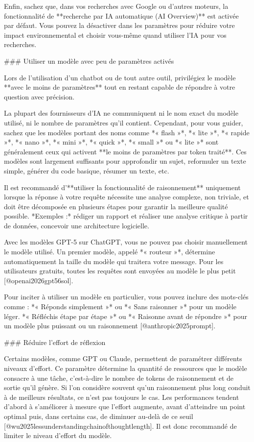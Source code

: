 Enfin, sachez que, dans vos recherches avec Google ou d'autres moteurs, la fonctionnalité de **recherche par IA automatique (AI Overview)** est activée par défaut. Vous pouvez la désactiver dans les paramètres pour réduire votre impact environnemental et choisir vous-même quand utiliser l'IA pour vos recherches.

### Utiliser un modèle avec peu de paramètres activés

Lors de l'utilisation d'un chatbot ou de tout autre outil, privilégiez le modèle **avec le moins de paramètres** tout en restant capable de répondre à votre question avec précision.

La plupart des fournisseurs d'IA ne communiquent ni le nom exact du modèle utilisé, ni le nombre de paramètres qu'il contient. Cependant, pour vous guider, sachez que les modèles portant des noms comme *« flash »*, *« lite »*, *« rapide »*, *« nano »*, *« mini »*, *« quick »*, *« small »* ou *« lite »* sont généralement ceux qui activent **le moins de paramètres par token traité**. Ces modèles sont largement suffisants pour approfondir un sujet, reformuler un texte simple, générer du code basique, résumer un texte, etc.

Il est recommandé d'**utiliser la fonctionnalité de raisonnement** uniquement lorsque la réponse à votre requête nécessite une analyse complexe, non triviale, et doit être décomposée en plusieurs étapes pour garantir la meilleure qualité possible.
*Exemples :* rédiger un rapport et réaliser une analyse critique à partir de données, concevoir une architecture logicielle.

Avec les modèles GPT-5 sur ChatGPT, vous ne pouvez pas choisir manuellement le modèle utilisé. Un premier modèle, appelé *« routeur »*, détermine automatiquement la taille du modèle qui traitera votre message.
Pour les utilisateurs gratuits, toutes les requêtes sont envoyées au modèle le plus petit [@openai2026gpt56sol].

Pour inciter à utiliser un modèle en particulier, vous pouvez inclure des mots-clés comme :
*« Réponds simplement »* ou *« Sans raisonner »* pour un modèle léger.
*« Réfléchis étape par étape »* ou *« Raisonne avant de répondre »* pour un modèle plus puissant ou un raisonnement [@anthropic2025prompt].

### Réduire l'effort de réflexion

Certains modèles, comme GPT ou Claude, permettent de paramétrer différents niveaux d'effort. Ce paramètre détermine la quantité de ressources que le modèle consacre à une tâche, c'est-à-dire le nombre de tokens de raisonnement et de sortie qu'il génère. Si l'on considère souvent qu'un raisonnement plus long conduit à de meilleurs résultats, ce n'est pas toujours le cas. Les performances tendent d'abord à s'améliorer à mesure que l'effort augmente, avant d'atteindre un point optimal puis, dans certains cas, de diminuer au-delà de ce seuil [@wu2025lessunderstandingchainofthoughtlength].
Il est donc recommandé de limiter le niveau d'effort du modèle.

